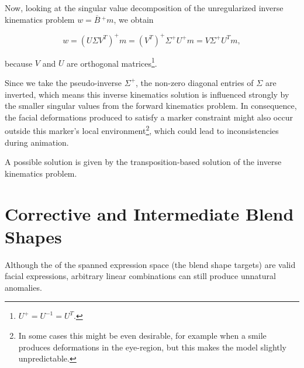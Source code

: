 Now, looking at the singular value decomposition of the unregularized inverse kinematics problem \(w=\overline{B}\,^+ m\), we obtain

\[w=(U\Sigma V^T)^+ m=(V^T)^+\Sigma^+U^+ m=V\Sigma^+U^T m,\]

because \(V\) and \(U\) are orthogonal matrices\footnote{
  \(U^+=U^{-1}=U^T\).
}.

Since we take the pseudo-inverse \(\Sigma^+\),
the non-zero diagonal entries of \(\Sigma\) are inverted,
which means this inverse kinematics solution is influenced strongly by the smaller singular values from the forward kinematics problem.
In consequence, the facial deformations produced to satisfy a marker constraint might also occur outside this marker's local environment\footnote{
  In some cases this might be even desirable,
  for example when a smile produces deformations in the eye-region,
  but this makes the model slightly unpredictable.
}, which could lead to inconsistencies during animation.

A possible solution is given by the transposition-based solution of the inverse kinematics problem.~\autocite{transpositiondirectmanipulationblendshapes}~\autocite{jacobiantranspose}

\section{Corrective and Intermediate Blend Shapes}
\label{sec:correctiveblendshapes}

Although the  of the spanned expression space (the blend shape targets) are valid facial expressions,
arbitrary linear combinations can still produce unnatural anomalies.

